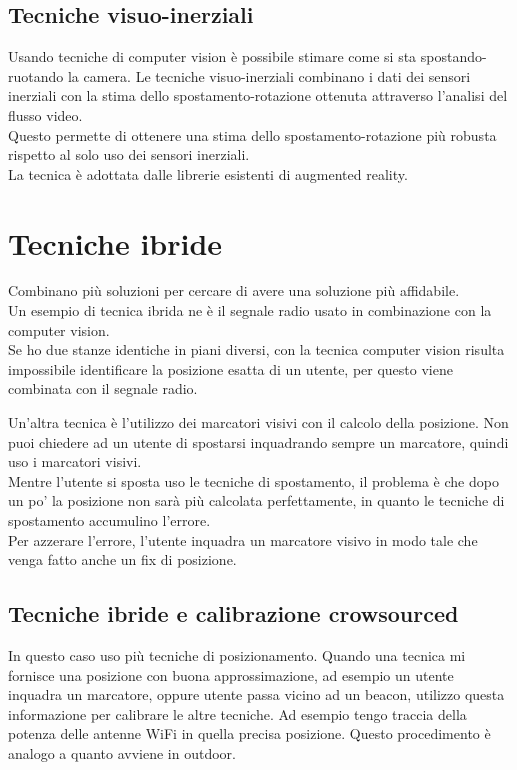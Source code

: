 \subsection{Tecniche visuo-inerziali}
Usando tecniche di computer vision è possibile stimare come si sta 
spostando-ruotando la camera.
Le tecniche visuo-inerziali combinano i dati dei sensori inerziali con la stima dello spostamento-rotazione ottenuta attraverso l’analisi del 
flusso video.
\\ Questo permette di ottenere una stima dello spostamento-rotazione 
più robusta rispetto al solo uso dei sensori inerziali.
\\ La tecnica è adottata dalle librerie esistenti di augmented reality.

\section{Tecniche ibride}
Combinano più soluzioni per cercare di avere una soluzione più affidabile.
\\ Un esempio di tecnica ibrida ne è il segnale radio usato in combinazione con la computer vision.
\\ Se ho due stanze identiche in piani diversi, con la tecnica computer vision risulta impossibile identificare la posizione esatta di un utente, per questo viene combinata con il segnale radio. 

Un'altra tecnica è l'utilizzo dei marcatori visivi con il calcolo della posizione. Non puoi chiedere ad un utente di spostarsi inquadrando sempre un marcatore, quindi uso i marcatori visivi. 
\\ Mentre l'utente si sposta uso le tecniche di spostamento, il problema è che dopo un po' la posizione non sarà più calcolata perfettamente, in quanto le tecniche di spostamento accumulino l'errore.
\\ Per azzerare l'errore, l'utente inquadra un marcatore visivo in modo tale che venga fatto anche un fix di posizione. 

\subsection{Tecniche ibride e calibrazione crowsourced}
In questo caso uso più tecniche di posizionamento. 
Quando una tecnica mi fornisce una posizione con buona approssimazione, ad esempio un utente inquadra un marcatore, oppure utente passa vicino ad un beacon, utilizzo questa informazione per calibrare le altre tecniche. Ad esempio tengo traccia della potenza delle antenne WiFi in quella precisa posizione.
Questo procedimento è analogo a quanto avviene in outdoor.

